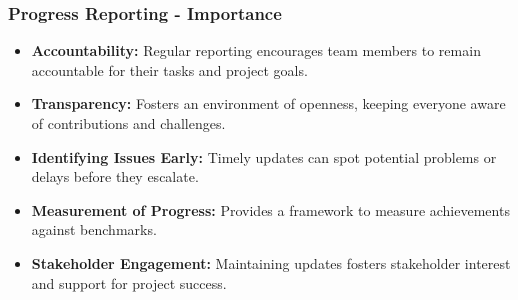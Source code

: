 \documentclass[aspectratio=169]{beamer}
\begin{document}
\begin{frame}[fragile]
    \frametitle{Progress Reporting - Importance}
    \begin{itemize}
        \item \textbf{Accountability:} Regular reporting encourages team members to remain accountable for their tasks and project goals.
        \item \textbf{Transparency:} Fosters an environment of openness, keeping everyone aware of contributions and challenges.
        \item \textbf{Identifying Issues Early:} Timely updates can spot potential problems or delays before they escalate.
        \item \textbf{Measurement of Progress:} Provides a framework to measure achievements against benchmarks.
        \item \textbf{Stakeholder Engagement:} Maintaining updates fosters stakeholder interest and support for project success.
    \end{itemize}
\end{frame}
\end{document}
